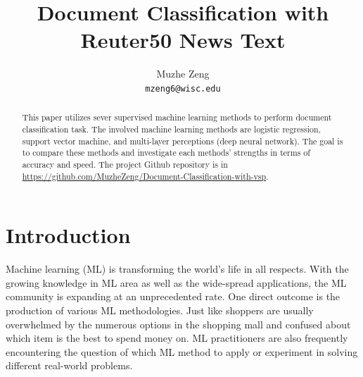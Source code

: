 \documentclass{article}
\title{Document Classification with Reuter50 News Text}
\author{
Muzhe Zeng\\
\texttt{mzeng6@wisc.edu} 
}
\begin{document}


\maketitle


\begin{abstract}
This paper utilizes sever supervised machine learning methods to perform document classification task. The involved machine learning methods are logistic regression, support vector machine, and multi-layer perceptions (deep neural network). The goal is to compare these methods and investigate each methods' strengths in terms of accuracy and speed.  The project Github repository is in \url{https://github.com/MuzheZeng/Document-Classification-with-vsp}.
\end{abstract}


\section{Introduction}
Machine learning (ML) is transforming the world's life in all respects. With the growing knowledge in ML area as well as the wide-spread applications, the ML community is expanding at an unprecedented rate. One direct outcome is the production of various ML methodologies. Just like shoppers are usually overwhelmed by the numerous options in the shopping mall and confused about which item is the best to spend money on. ML practitioners are also frequently encountering the question of which ML method to apply or experiment in solving different real-world problems. 
\end{document}
